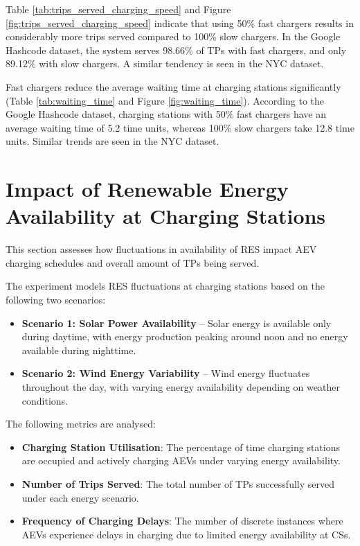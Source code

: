 Table \ref{tab:trips_served_charging_speed} and Figure \ref{fig:trips_served_charging_speed} indicate that using 50\% fast chargers results in considerably more trips served compared to 100\% slow chargers. In the Google Hashcode dataset, the system serves 98.66\% of TPs with fast chargers, and only 89.12\% with slow chargers. A similar tendency is seen in the NYC dataset.

Fast chargers reduce the average waiting time at charging stations significantly (Table \ref{tab:waiting_time} and Figure \ref{fig:waiting_time}). According to the Google Hashcode dataset, charging stations with 50\% fast chargers have an average waiting time of 5.2 time units, whereas 100\% slow chargers take 12.8 time units. Similar trends are seen in the NYC dataset.

\section{Impact of Renewable Energy Availability at Charging Stations}
\label{sec:renewable_energy}

This section assesses how fluctuations in availability of RES impact AEV charging schedules and overall amount of TPs being served.

The experiment models RES fluctuations at charging stations based on the following two scenarios:
\begin{itemize}
    \item \textbf{Scenario 1: Solar Power Availability} – Solar energy is available only during daytime, with energy production peaking around noon and no energy available during nighttime.
    \item \textbf{Scenario 2: Wind Energy Variability} – Wind energy fluctuates throughout the day, with varying energy availability depending on weather conditions.
\end{itemize}

The following metrics are analysed:

\begin{itemize}
    \item \textbf{Charging Station Utilisation}: The percentage of time charging stations are occupied and actively charging AEVs under varying energy availability.
    \item \textbf{Number of Trips Served}: The total number of TPs successfully served under each energy scenario.
    \item \textbf{Frequency of Charging Delays}: The number of discrete instances where AEVs experience delays in charging due to limited energy availability at CSs.
\end{itemize}

